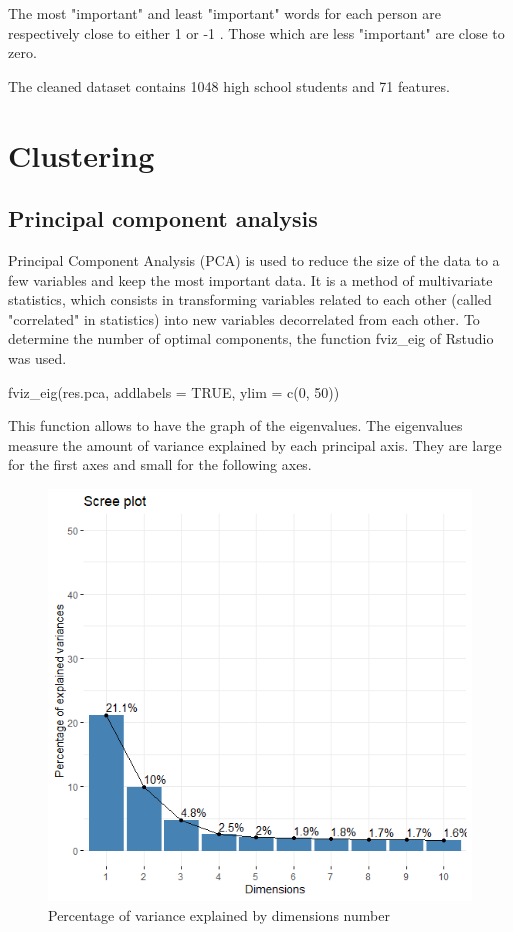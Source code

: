 \documentclass[12pt]{article}
\begin{document}
The most "important" and least "important" words for each person are respectively close to either 1 or -1 . Those which are less "important" are close to zero.

The cleaned dataset contains 1048
high school students and 71 features.


\section{Clustering} 


\subsection{Principal component analysis}

Principal Component Analysis (PCA) is used to reduce the size of the data to a few variables and keep the most important data. It is a method of multivariate statistics, which consists in transforming variables related to each other (called "correlated" in statistics) into new variables decorrelated from each other. To determine the number of optimal components, the function fviz\_eig of Rstudio was used. 


\begin{customFrame}
fviz_eig(res.pca, addlabels = TRUE, ylim = c(0, 50))
\end{customFrame}
 

This function allows to have the graph of the eigenvalues.
The eigenvalues measure the amount of variance explained by each principal axis. They are large for the first axes and small for the following axes.


\begin{figure}[H]
\begin{center}
\includegraphics[scale=1.]{ACP_0.png} 
\caption[]{Percentage of variance explained by dimensions number }
\end{center}
\end{figure}
\end{document}
